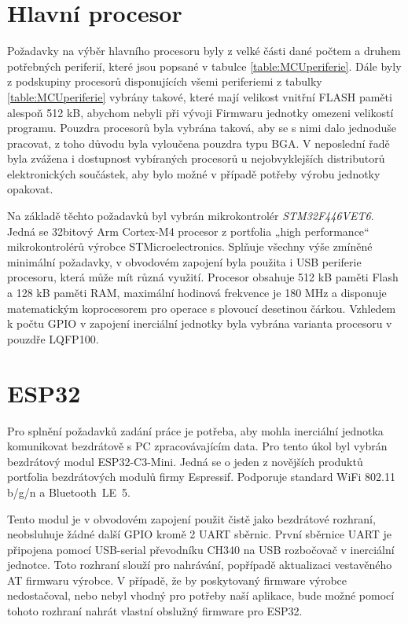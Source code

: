 \section{Hlavní procesor}
Požadavky na výběr hlavního procesoru byly z velké části dané počtem a druhem potřebných periferií, které jsou popsané v tabulce \ref{table:MCUperiferie}.
Dále byly z podskupiny procesorů disponujících všemi periferiemi z tabulky \ref{table:MCUperiferie} vybrány takové, které mají velikost vnitřní FLASH paměti alespoň 512 kB, abychom nebyli při vývoji Firmwaru jednotky omezeni velikostí programu. Pouzdra procesorů byla vybrána taková, aby se s nimi dalo jednoduše pracovat, z toho důvodu byla vyloučena pouzdra typu \ac{BGA}. 
V neposlední řadě byla zvážena i dostupnost vybíraných procesorů u nejobvyklejších distributorů elektronických součástek, aby bylo možné v případě potřeby výrobu jednotky opakovat.



Na základě těchto požadavků byl vybrán mikrokontrolér \emph{STM32F446VET6}. Jedná se 32bitový Arm Cortex-M4 procesor z portfolia „high performance“ mikrokontrolérů výrobce STMicroelectronics. Splňuje všechny výše zmíněné minimální požadavky, v obvodovém zapojení byla použita i USB periferie procesoru, která může mít různá využití. Procesor obsahuje 512 kB paměti Flash a 128 kB paměti RAM, maximální hodinová frekvence je 180 MHz a disponuje matematickým koprocesorem pro operace s plovoucí desetinou čárkou. Vzhledem k počtu \ac{GPIO} v zapojení inerciální jednotky byla vybrána varianta procesoru v pouzdře LQFP100. \cite{csdGtKJDMSdbwJ9r}

\section{ESP32}
Pro splnění požadavků zadání práce je potřeba, aby mohla inerciální jednotka komunikovat bezdrátově s PC zpracovávajícím data. Pro tento úkol byl vybrán bezdrátový modul ESP32-C3-Mini. Jedná se o jeden z novějších produktů portfolia bezdrátových modulů firmy Espressif. Podporuje standard WiFi 802.11 b/g/n a Bluetooth~LE~5. \cite{zJ7x5ye8Y5eJn1E2}

Tento modul je v obvodovém zapojení použit čistě jako bezdrátové rozhraní, neobsluhuje žádné další \ac{GPIO} kromě 2 \ac{UART} sběrnic. První sběrnice \ac{UART} je připojena pomocí USB-serial převodníku CH340 na \ac{USB} rozbočovač v inerciální jednotce. Toto rozhraní slouží pro nahrávání, popřípadě aktualizaci vestavěného AT firmwaru výrobce. V případě, že by poskytovaný firmware výrobce nedostačoval, nebo nebyl vhodný pro potřeby naší aplikace, bude možné pomocí tohoto rozhraní nahrát vlastní obslužný firmware pro ESP32.

